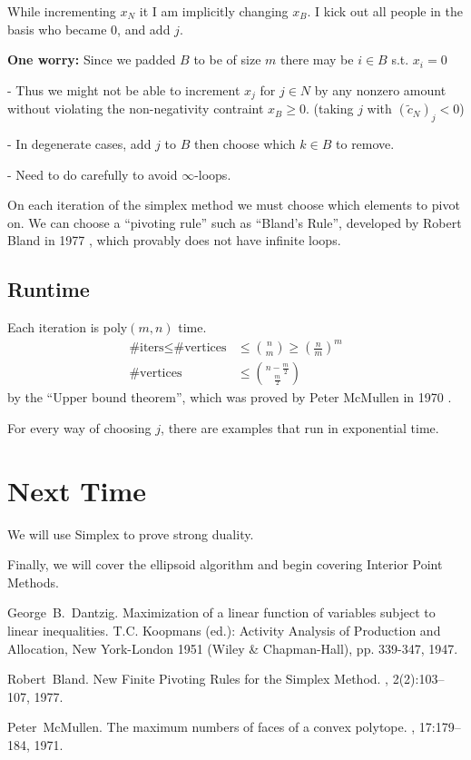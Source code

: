 \documentclass[11pt]{article}
\begin{document}
While incrementing $x_N$ it I am implicitly changing $x_B$.
I kick out all people in the basis who became 0, and add $j$.

\textbf{One worry:} Since we padded $B$ to be of size $m$ there may be $i \in B$ s.t.
$x_i = 0$

- Thus we might not be able to increment $x_j$ for $j \in N$ by any nonzero amount
without violating the non-negativity contraint $x_B \geq 0$.
(taking $j$ with $(\tilde c_N)_j < 0$)

- In degenerate cases, add $j$ to $B$ then choose which $k \in B$ to remove.

- Need to do carefully to avoid $\infty$-loops.

On each iteration of the simplex method we must choose which elements to pivot on.
We can choose a ``pivoting rule'' such as ``Bland's Rule'', developed by Robert Bland in 1977
\cite{BlanMR77}, which provably does not have infinite loops.

\subsection{Runtime}
Each iteration is poly$(m,n)$ time.
\begin{align*}
  \mbox{\#iters} \leq \mbox{\#vertices} &\leq {n \choose m} \geq \left( \frac nm \right)^m\\
\mbox{\#vertices} &\leq {n - \frac{m}{2} \choose \frac{m}{2}} 
\end{align*}
by the ``Upper bound theorem'', which was proved by Peter McMullen in 1970 \cite{McMuMA77}.

For every way of choosing $j$, there are examples that run in exponential time.

\section{Next Time}

We will use Simplex to prove strong duality.

Finally, we will cover the ellipsoid algorithm and begin covering Interior Point Methods.



\begin{thebibliography}{42}

George~B.~Dantzig.
\newblock Maximization of a linear function of variables subject to linear inequalities.
\newblock T.C. Koopmans (ed.): Activity Analysis of Production and Allocation, New York-London 1951 (Wiley \& Chapman-Hall), pp. 339-347, 1947.

Robert~Bland.
\newblock New Finite Pivoting Rules for the Simplex Method.
, 2(2):103--107, 1977.

Peter~McMullen.
\newblock The maximum numbers of faces of a convex polytope.
, 17:179--184, 1971.

\end{thebibliography}
\end{document}
